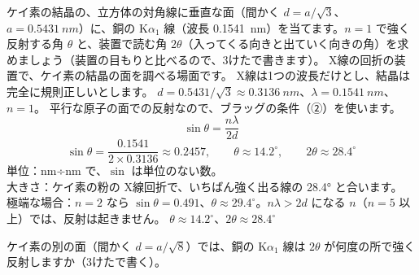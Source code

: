 \label{ph:原-8:ex2}
\begin{phreidai}
ケイ素の結晶の、立方体の対角線に垂直な面（間かく $d=a/\sqrt3$、$a=\qty{0.5431}{nm}$）に、銅の K$\alpha_1$ 線（波長 \qty{0.1541}{nm}）を当てます。$n=1$ で強く反射する角 $\theta$ と、装置で読む角 $2\theta$（入ってくる向きと出ていく向きの角）を求めましょう（装置の目もりと比べるので、3けたで書きます）。
\phbamen
X線の回折の装置で、ケイ素の結晶の面を調べる場面です。
\phmushi
X線は1つの波長だけとし、結晶は完全に規則正しいとします。
\phzu
$d=0.5431/\sqrt3\approx\qty{0.3136}{nm}$、$\lambda=\qty{0.1541}{nm}$、$n=1$。
\phriyu
平行な原子の面での反射なので、ブラッグの条件（②）を使います。
\phtateru
\[ \sin\theta=\frac{n\lambda}{2d} \]
\phtoku
\[ \sin\theta=\frac{0.1541}{2\times0.3136}\approx0.2457,\qquad \theta\approx14.2^\circ,\qquad 2\theta\approx28.4^\circ \]
\phtashikame
単位：nm÷nm で、$\sin$ は単位のない数。\\
大きさ：ケイ素の粉の X線回折で、いちばん強く出る線の 28.4° と合います。\\
極端な場合：$n=2$ なら $\sin\theta=0.491$、$\theta\approx29.4^\circ$。$n\lambda>2d$ になる $n$（$n=5$ 以上）では、反射は起きません。
\kotae $\theta\approx14.2^\circ$、$2\theta\approx28.4^\circ$
\end{phreidai}
\begin{jibun}
ケイ素の別の面（間かく $d=a/\sqrt8$）では、銅の K$\alpha_1$ 線は $2\theta$ が何度の所で強く反射しますか（3けたで書く）。
\end{jibun}

